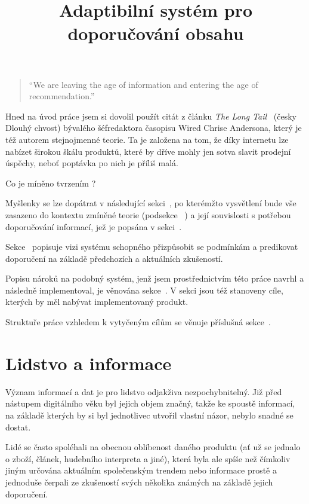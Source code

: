\documentclass[thesis=M,czech]{FITthesis}[2014/05/07]
\title{Adaptibilní systém pro doporučování obsahu}
\begin{document}

\begin{introduction}
	\begin{quote}
		``We are leaving the age of information and entering the age of recommendation.''
	\end{quote}
	Hned na úvod práce jsem si dovolil použít citát z článku \emph{The Long Tail}~\cite{anderson} (česky Dlouhý chvost) bývalého šéfredaktora časopisu Wired Chrise Andersona, který je též autorem stejnojmenné teorie. Ta je založena na tom, že díky internetu lze nabízet širokou škálu produktů, které by dříve mohly jen sotva slavit prodejní úspěchy, neboť poptávka po nich je příliš malá. 
	
	Co je míněno tvrzením ?
	
	Myšlenky se lze dopátrat v následující sekci~, po kterémžto vysvětlení bude vše zasazeno do kontextu zmíněné teorie (podsekce ~) a její souvislosti s potřebou doporučování informací, jež je popsána v sekci~.
	
	Sekce~ popisuje vizi systému schopného přizpůsobit se podmínkám a predikovat doporučení na základě předchozích a aktuálních zkušeností.
	
	Popisu nároků na podobný systém, jenž jsem prostřednictvím této práce navrhl a následně implementoval, je věnována sekce~. V sekci jsou též stanoveny cíle, kterých by měl nabývat implementovaný produkt. 
	
	Struktuře práce vzhledem k vytyčeným cílům se věnuje příslušná sekce~.
	
\section{Lidstvo a informace}	
	\label{sub:lidinf}
	Význam informací a dat je pro lidstvo odjakživa nezpochybnitelný. Již před nástupem digitálního věku byl jejich objem značný, takže ke spoustě informací, na základě kterých by si byl jednotlivec utvořil vlastní názor, nebylo snadné se dostat.
	
	Lidé se často spoléhali na obecnou oblíbenost daného produktu (ať už se jednalo o zboží, článek, hudebního interpreta a jiné), která byla ale spíše než čímkoliv jiným určována aktuálním společenským trendem nebo informace prostě a jednoduše čerpali ze zkušeností svých několika známých na základě jejich doporučení.


\end{introduction}
\end{document}
